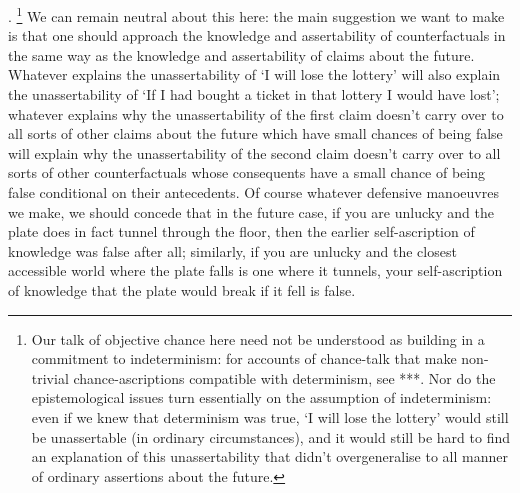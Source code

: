 \documentclass[If.tex]{subfiles}
\begin{document}
\cite{HawthorneKL}.%
\footnote{Our talk of objective chance here need not be understood as building in a commitment to indeterminism: for accounts of chance-talk that make non-trivial chance-ascriptions compatible with determinism, see ***. Nor do the epistemological issues turn essentially on the assumption of indeterminism: even if we knew that determinism was true, ‘I will lose the lottery’ would still be unassertable (in ordinary circumstances), and it would still be hard to find an explanation of this unassertability that didn't overgeneralise to all manner of ordinary assertions about the future.} 
We can remain neutral about this here: the main suggestion we want to make is that one should approach the knowledge and assertability of counterfactuals in the same way as the knowledge and assertability of claims about the future. Whatever explains the unassertability of ‘I will lose the lottery’ will also explain the unassertability of ‘If I had bought a ticket in that lottery I would have lost’; whatever explains why the unassertability of the first claim doesn't carry over to all sorts of other claims about the future which have small chances of being false will explain why the unassertability of the second claim doesn't carry over to all sorts of other counterfactuals whose consequents have a small chance of being false conditional on their antecedents. Of course whatever defensive manoeuvres we make, we should concede that in the future case, if you are unlucky and the plate does in fact tunnel through the floor, then the earlier self-ascription of knowledge was false after all; similarly, if you are unlucky and the closest accessible world where the plate falls is one where it tunnels, your self-ascription of knowledge that the plate would break if it fell is false.%
\end{document}
